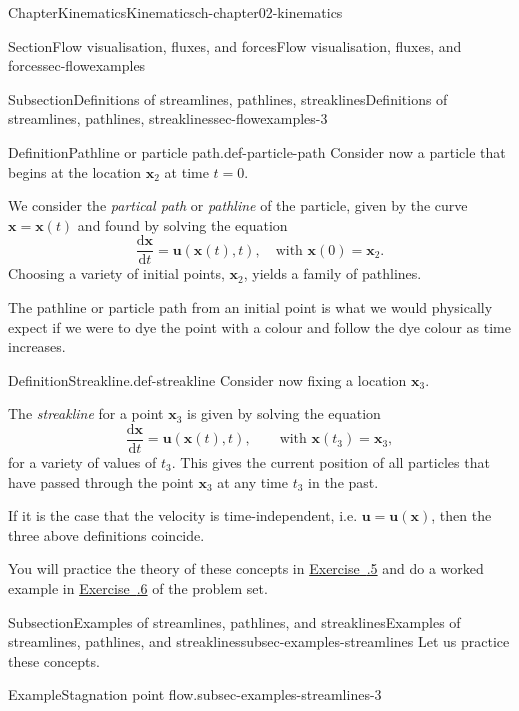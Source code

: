 \documentclass[oneside,10pt,]{book}
\newcommand{\xreffont}{\relax}
\numberwithin{equation}{section}
\newcommand{\de}{\mathrm{d}}
\newcommand{\dd}[2]{\frac{\de#1}{\de#2}}
\newcommand{\bx}{\boldsymbol{x}}
\newcommand{\bu}{\boldsymbol{u}}
\begin{document}
\begin{chapterptx}{Chapter}{Kinematics}{}{Kinematics}{}{}{ch-chapter02-kinematics}
\begin{sectionptx}{Section}{Flow visualisation, fluxes, and forces}{}{Flow visualisation, fluxes, and forces}{}{}{sec-flowexamples}
\begin{subsectionptx}{Subsection}{Definitions of streamlines, pathlines, streaklines}{}{Definitions of streamlines, pathlines, streaklines}{}{}{sec-flowexamples-3}
\begin{definition}{Definition}{Pathline or particle path.}{}{def-particle-path}%
Consider now a particle that begins at the location \(\bx_2\) at time \(t = 0\).%
\par
We consider the \emph{partical path} or \emph{pathline} of the particle, given by the curve \(\bx = \bx(t)\) and found by solving the equation%
\begin{equation*}
\dd{\bx}{t} = \bu(\bx(t), t), \quad \text{with $\bx(0) = \bx_2$.}
\end{equation*}
Choosing a variety of initial points, \(\bx_2\), yields a family of pathlines.%
\end{definition}
The pathline or particle path from an initial point is what we would physically expect if we were to dye the point with a colour and follow the dye colour as time increases.%
\begin{definition}{Definition}{Streakline.}{}{def-streakline}%
Consider now fixing a location \(\bx_3\).%
\par
The \emph{streakline} for a point \(\bx_3\) is given by solving the equation%
\begin{equation*}
\dd{\bx}{t} = \bu(\bx(t), t), \qquad \textrm{with $\bx(t_3) = \bx_3$},
\end{equation*}
for a variety of values of \(t_3\). This gives the current position of all particles that have passed through the point \(\bx_3\) at any time \(t_3\) in the past.%
\end{definition}
If it is the case that the velocity is time-independent, i.e. \(\bu = \bu(\bx)\), then the three above definitions coincide.%
\par
You will practice the theory of these concepts in \hyperlink{ex-hw-particle-paths-streamlines}{Exercise~{\xreffont 2.3.5}} and do a worked example in \hyperlink{ex-hw-streamlines-pathlines-streaklines}{Exercise~{\xreffont 2.3.6}} of the problem set.%
\end{subsectionptx}
%
%
\typeout{************************************************}
\typeout{************************************************}
%
\begin{subsectionptx}{Subsection}{Examples of streamlines, pathlines, and streaklines}{}{Examples of streamlines, pathlines, and streaklines}{}{}{subsec-examples-streamlines}
Let us practice these concepts.%
\begin{example}{Example}{Stagnation point flow.}{subsec-examples-streamlines-3}%

\end{example}
\end{subsectionptx}
\end{sectionptx}
\end{chapterptx}
\end{document}
